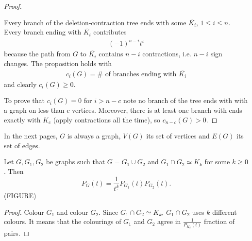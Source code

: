 \begin{proof}
\begin{center}
\end{center}
Every branch of the deletion-contraction tree ends with some $\overline{K_i}$, $1\le i \le n$. Every branch ending with $\overline{K_i}$ contributes
\begin{align*}
(-1)^{n-i}t^i
\end{align*}
because the path from $G$ to $\overline{K_i}$ contains $n-i$ contractions, i.e. $n-i$ sign changes. The proposition holds with
\begin{align*}
c_i(G)=\# \text{ of branches ending with } \overline{K_i}
\end{align*}
and clearly $c_i(G)\geq 0$.

To prove that $c_i(G)=0$ for $i>n-c$ note no branch of the tree ends with with a graph on less than $c$ vertices. Moreover, there is at least one branch with ends exactly with $K_c$ (apply contractions all the time), so $c_{n-c}(G)>0$.
\end{proof}





In the next pages, $G$ is always a graph, $V(G)$ its set of vertices and $E(G)$ its set of edges. 

\begin{lemma} Let $G,G_1,G_2$ be graphs such that $G=G_1 \cup G_2$ and $G_1 \cap G_2 \simeq K_k$ for some $k\geqslant 0$. Then
$$P_G(t)=\frac{1}{t^{\underline{k}}}P_{G_1}(t)P_{G_2}(t).$$
(FIGURE)
\end{lemma}

\begin{proof}
Colour $G_1$ and colour $G_2$. Since $G_1 \cap G_2 \simeq K_k$, $G_1 \cap G_2$ uses $k$ different colours. It means that the colourings of $G_1$ and $G_2$ agree in $\frac{1}{P_{K_k}(t)}$ fraction of pairs.
\end{proof}

